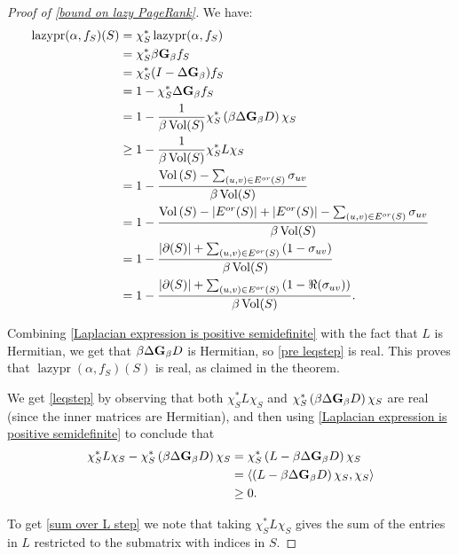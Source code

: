 \documentclass[12pt]{article}
\theoremstyle{definition}
\DeclarePairedDelimiter\abs{\lvert}{\rvert}
\DeclareMathOperator{\lazypr}{lazypr}
\DeclareMathOperator{\vol}{Vol}
\newcommand{\laplace}{\Delta}
\newcommand{\asymgreen}{\normalfont{\textbf{G}}}
\DeclarePairedDelimiter\inner{\langle}{\rangle}
\begin{document}
\begin{proof}[Proof of \cref{bound on lazy PageRank}]
We have:
\begin{align}
\lazypr(\alpha, f_S)(S)
&= \chi_S^* \lazypr(\alpha, f_S) \nonumber \\
&= \chi_S^* \beta \asymgreen_\beta f_S \nonumber \\
&= \chi_S^* (I - \laplace \asymgreen_\beta) f_S \nonumber \\
&= 1 - \chi_S^* \laplace \asymgreen_\beta f_S \nonumber \\
&= 1 - \frac{1}{\beta \vol(S)} \chi_S^* \left( \beta \laplace \asymgreen_\beta D \right) \chi_S \label{pre leqstep} \\
&\geq 1 - \frac{1}{\beta \vol(S)} \chi_S^* L \chi_S \label{leqstep} \\
&= 1 - \frac{\vol{(S)} - \sum_{(u,v) \in E^{or}(S)} \sigma_{uv}}{\beta \vol(S)} \label{sum over L step} \\
&= 1 - \frac{\vol{(S)} - \abs*{E^{or}(S)} + \abs*{E^{or}(S)} - \sum_{(u,v) \in E^{or}(S)} \sigma_{uv}}{\beta \vol(S)} \nonumber \\
&= 1 - \frac{\abs*{\partial(S)} + \sum_{(u,v) \in E^{or}(S)}{(1 - \sigma_{uv})}}{\beta \vol (S)} \nonumber \\
&= 1 - \frac{\abs*{\partial(S)} + \sum_{(u,v) \in E^{or}(S)}{(1 - \Re(\sigma_{uv}))}}{\beta \vol (S)}. \nonumber
\end{align}

Combining \cref{Laplacian expression is positive semidefinite} with the fact that $L$ is Hermitian, we get that $\beta \laplace \asymgreen_\beta D$ is Hermitian, so \cref{pre leqstep} is real. This proves that $\lazypr(\alpha, f_S)(S)$ is real, as claimed in the theorem. 

We get \cref{leqstep} by observing that both $\chi_S^* L \chi_S$ and $\chi_S^* \left( \beta \laplace \asymgreen_\beta D \right) \chi_S$ are real (since the inner matrices are Hermitian), and then using \cref{Laplacian expression is positive semidefinite} to conclude that
\begin{align*}
\chi_S^* L \chi_S - \chi_S^* \left( \beta \laplace \asymgreen_\beta D \right) \chi_S
&= \chi_S^* \left( L - \beta \laplace \asymgreen_\beta D \right) \chi_S \\
&= \inner*{\left( L - \beta \laplace \asymgreen_\beta D \right) \chi_S, \chi_S} \\
&\geq 0.
\end{align*}

To get \cref{sum over L step} we note that taking $\chi_S^* L \chi_S$ gives the sum of the entries in $L$ restricted to the submatrix with indices in $S$.
\end{proof}
\end{document}
